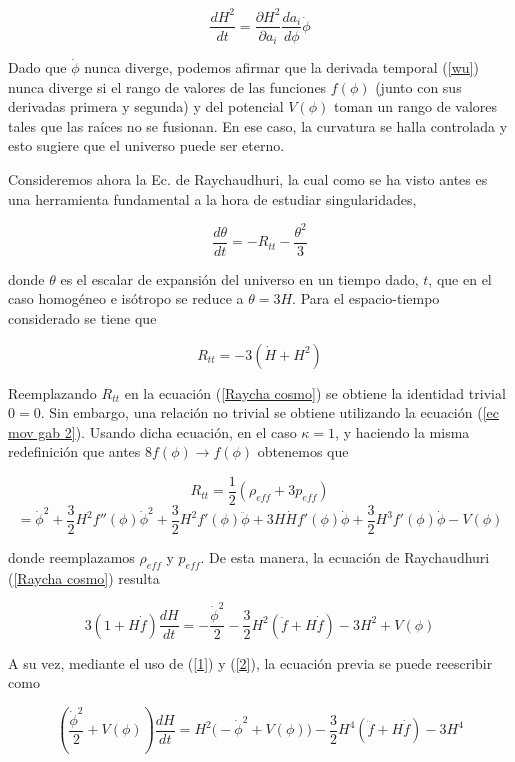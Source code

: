 \begin{equation}\label{wu}
    \frac{dH^2}{dt}=\frac{\partial H^2}{\partial a_i}\frac{da_i}{d\phi}\dot{\phi}
\end{equation}



Dado que $\dot{\phi}$ nunca diverge, podemos afirmar que la derivada temporal (\ref{wu}) nunca diverge si el rango de valores de las funciones $f(\phi)$ (junto con sus derivadas primera y segunda) y del potencial $V(\phi)$ toman un rango de valores tales que las raíces no se fusionan. En ese caso, la curvatura se halla controlada y esto sugiere que el universo puede ser eterno.


Consideremos ahora la Ec. de Raychaudhuri, la cual como se ha visto antes es una herramienta fundamental a la hora de estudiar singularidades,

\begin{equation}\label{Raycha cosmo}
\frac{d\theta}{dt}=-R_{tt}-\frac{\theta^2}{3}
\end{equation}

donde $\theta$ es el escalar de expansión del universo en un tiempo dado, $t$, que en el caso homogéneo e isótropo se reduce a $\theta=3H$. Para el espacio-tiempo considerado se tiene que 

$$
R_{tt}=-3\left(\dot H + H^2\right)
$$

Reemplazando $R_{tt}$ en la ecuación (\ref{Raycha cosmo}) se obtiene la identidad trivial $0=0$. Sin embargo, una relación no trivial se obtiene utilizando la ecuación (\ref{ec mov gab 2}). Usando dicha ecuación, en el caso $\kappa=1$, y haciendo la misma redefinición que antes $8f(\phi)\to f(\phi)$ obtenemos que 

$$
R_{tt}=\frac{1}{2}(\rho_{eff}+3p_{eff})
$$
$$
=\dot{\phi}^2+\frac{3}{2}H^2 f''(\phi)\dot{\phi}^2+\frac{3}{2}H^2 f'(\phi)\ddot{\phi}+3 H\dot{H} f'(\phi)\dot{\phi}+\frac{3}{2} H^3 f'(\phi)\dot{\phi}-V(\phi)
$$

donde reemplazamos $\rho_{eff}$ y $p_{eff}$. De esta manera, la ecuación de Raychaudhuri (\ref{Raycha cosmo}) resulta

\begin{equation}
3(1+H\dot{f})\frac{dH}{dt}=-\frac{\dot{\phi}^2}{2}-\frac{3}{2}H^2 (\ddot{f}+H\dot{f})-3H^2+V(\phi)
\end{equation}

A su vez, mediante el uso de (\ref{1}) y (\ref{2}), la ecuación previa se puede reescribir como

\begin{equation}
\left(\frac{\dot{\phi}^2}{2}+V(\phi)\right)\frac{dH}{dt}=H^2\bigg(-\dot{\phi}^2+V(\phi)\bigg)-\frac{3}{2}H^4(\ddot{f}+H\dot{f})-3H^4
\end{equation}


